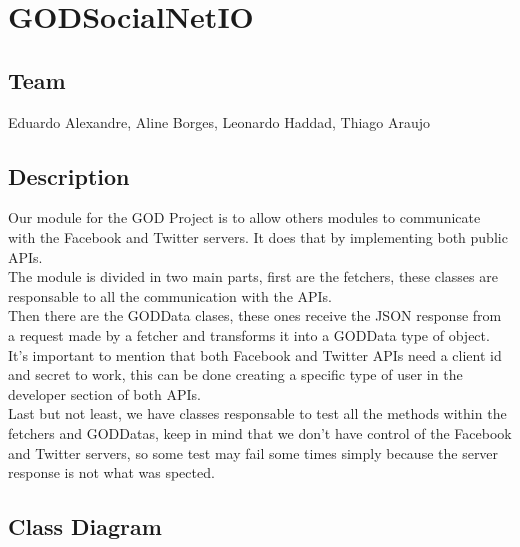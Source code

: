 \usepackage[utf8]{inputenc}
\usepackage[T1]{fontenc}
\usepackage{fixltx2e}
\usepackage{graphicx}
\usepackage{longtable}
\usepackage{float}
\usepackage{wrapfig}
\usepackage{soul}
\usepackage{textcomp}
\usepackage{marvosym}
\usepackage{wasysym}
\usepackage{latexsym}
\usepackage{amssymb}
\usepackage{hyperref}
\usepackage{geometry}
\geometry{left=0.7in,right=0.7in,top=1in,bottom=1in}
\providecommand{\alert}[1]{\textbf{#1}}

\section{GODSocialNetIO}
\label{sec-1}
\subsection{Team}
\label{sec-1-1}

  Eduardo Alexandre, Aline Borges, Leonardo Haddad, Thiago Araujo
\subsection{Description}
\label{sec-1-2}

  Our module for the GOD Project is to allow others modules to communicate with the Facebook and Twitter servers. It does that by implementing both public APIs.\\

  The module is divided in two main parts, first are the fetchers, these classes are responsable to all the communication with the APIs.\\

  Then there are the GODData clases, these ones receive the JSON response from a request made by a fetcher and transforms it into a GODData type of object.\\

  It's important to mention that both Facebook and Twitter APIs need a client id and secret to work, this can be done creating a specific type of user in the developer section of both APIs.\\

  Last but not least, we have classes responsable to test all the methods within the fetchers and GODDatas, keep in mind that we don't have control of the Facebook and Twitter servers, so some test may fail some times simply because the server response is not what was spected.
\subsection{Class Diagram}
\label{sec-1-3}

